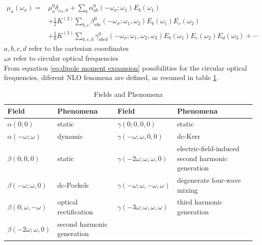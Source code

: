 \documentclass{article}
\begin{document}
		\begin{equation}\label{eq:dipole moment expansion}
		\begin{aligned}
		\mu_{a}\left(\omega_{\sigma}\right)= & \mu_{a}^{0} \delta_{\omega_{\sigma}, 0}+\sum_{b} \alpha_{a b}^{0}\left(-\omega_{\sigma} ; \omega_{1}\right) E_{b}\left(\omega_{1}\right) \\
		& +\frac{1}{2} K^{(2)} \sum_{b, c} \beta_{a b c}^{0}\left(-\omega_{\sigma} ; \omega_{1}, \omega_{2}\right) E_{b}\left(\omega_{1}\right) E_{c}\left(\omega_{2}\right) \\
		& +\frac{1}{6} K^{(3)} \sum_{b, c, d} \gamma_{a b c d}^{0}\left(-\omega_{\sigma} ; \omega_{1}, \omega_{2}, \omega_{3}\right) E_{b}\left(\omega_{1}\right) E_{c}\left(\omega_{2}\right) E_{d}\left(\omega_{3}\right)+\cdots
		\end{aligned}
		\end{equation}
		$a,b,c,d$ refer to the cartesian coordinates \\
		$\omega$s refer to circular optical frequencies\\
		\qquad From equation \ref{eq:dipole moment expansion} possibilities for the circular optical frequencies, diferent NLO fenomena are defined, as resumed in table \ref{tab:fields_phenomena}.\\
		\begin{table}[H] \caption{Fields and Phenomena}
			\begin{tabularx}{\textwidth}{| >{\centering\arraybackslash}X | >{\centering\arraybackslash}X | >{\centering\arraybackslash}X | >{\centering\arraybackslash}X |}
			\hline
			Field & Phenomena & Field & Phenomena \\
			\hline
			$\alpha(0;0)$ & static & $\gamma(0;0,0,0)$ & static \\
			\hline
			$\alpha(-\omega;\omega)$ & dynamic & $\gamma(-\omega;\omega,0,0)$ & dc-Kerr \\
			\hline
			$\beta(0;0,0)$ & static & $\gamma(-2\omega;\omega,\omega,0)$ & electric-field-induced second harmonic generation \\
			\hline
			$\beta(-\omega;\omega,0)$ & dc-Pockels & $\gamma(-\omega;\omega,-\omega,\omega)$ & degenerate four-wave mixing \\
			\hline
			$\beta(0;\omega,-\omega)$ & optical rectification & $\gamma(-3\omega;\omega,\omega,\omega)$ & third harmonic generation \\
			\hline
			$\beta(-2\omega;\omega,0)$ & second harmonic generation & & \\
			\hline
			\end{tabularx}
		\label{tab:fields_phenomena}
		\end{table}
\end{document}
